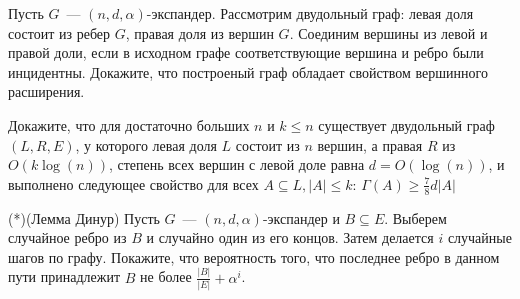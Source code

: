\setcounter{curtask}{1}

\mytitle{}

\begin{task}
    Пусть $G$~--- $(n, d, \alpha)$-экспандер. Рассмотрим двудольный граф: левая доля
    состоит из ребер $G$, правая доля из вершин $G$. Соединим вершины из левой и
    правой доли, если в исходном графе соответствующие вершина и ребро были
    инцидентны. Докажите, что построеный граф обладает свойством вершинного расширения.
\end{task}

\begin{task}
    Докажите, что для достаточно больших $n$ и $k \le n$ существует двудольный граф
    $(L, R, E)$, у которого левая доля $L$ состоит из $n$ вершин, а правая $R$ из
    $O(k\log(n))$, степень всех вершин с левой доле равна $d = O(\log(n))$, и
    выполнено следующее свойство для всех $A \subseteq L, |A| \le k$:
    $\Gamma(A) \ge \frac{7}{8}d|A|$
\end{task}

\begin{task}(*)(Лемма Динур)
    Пусть $G$~--- $(n, d, \alpha)$-экспандер и $B \subseteq E$. Выберем случайное
    ребро из $B$ и случайно один из его концов. Затем делается $i$ случайные шагов по
    графу. Покажите, что вероятность того, что последнее ребро в данном пути
    принадлежит $B$ не более $\frac{|B|}{|E|} + \alpha^i$.
\end{task}

